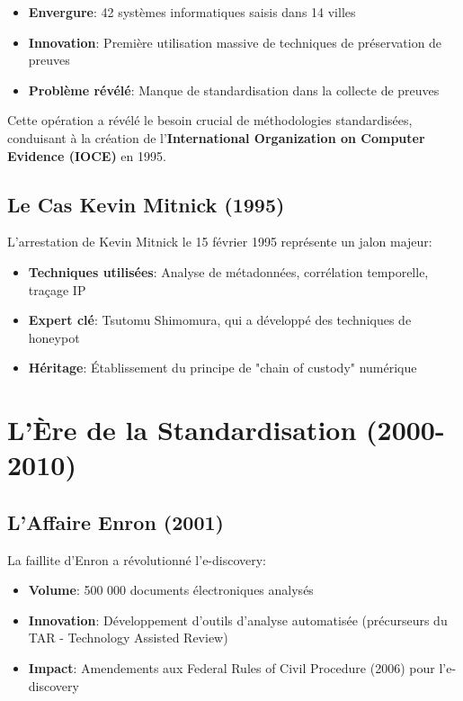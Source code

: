 \begin{itemize}
\item \textbf{Envergure}: 42 systèmes informatiques saisis dans 14 villes
\item \textbf{Innovation}: Première utilisation massive de techniques de préservation de preuves
\item \textbf{Problème révélé}: Manque de standardisation dans la collecte de preuves
\end{itemize}

Cette opération a révélé le besoin crucial de méthodologies standardisées, conduisant à la création de l'\textbf{International Organization on Computer Evidence (IOCE)} en 1995.

\subsection{Le Cas Kevin Mitnick (1995)}
L'arrestation de Kevin Mitnick le 15 février 1995 représente un jalon majeur:

\begin{itemize}
\item \textbf{Techniques utilisées}: Analyse de métadonnées, corrélation temporelle, traçage IP
\item \textbf{Expert clé}: Tsutomu Shimomura, qui a développé des techniques de honeypot
\item \textbf{Héritage}: Établissement du principe de "chain of custody" numérique
\end{itemize}

\section{L'Ère de la Standardisation (2000-2010)}
\subsection{L'Affaire Enron (2001)}
La faillite d'Enron a révolutionné l'e-discovery:

\begin{itemize}
\item \textbf{Volume}: 500 000 documents électroniques analysés
\item \textbf{Innovation}: Développement d'outils d'analyse automatisée (précurseurs du TAR - Technology Assisted Review)
\item \textbf{Impact}: Amendements aux Federal Rules of Civil Procedure (2006) pour l'e-discovery
\end{itemize}

